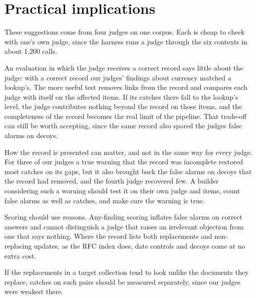 \section{Practical implications}
\label{sec:guide}

These suggestions come from four judges on one corpus. Each is cheap to check with one's own judge, since the harness
runs a judge through the six contexts in about 1,200 calls.

An evaluation in which the judge receives a correct record says little about the judge: with a correct record our
judges' findings about currency matched a lookup's. The more useful test removes links from the record and compares each judge with
itself on the affected items. If its catches there fall to the lookup's level, the judge contributes nothing beyond
the record on those items, and the completeness of the record becomes the real limit of the pipeline. That trade-off
can still be worth accepting, since the same record also spared the judges false alarms on decoys.

How the record is presented can matter, and not in the same way for every judge. For three of our judges a true
warning that the record was incomplete restored most catches on its gaps, but it also brought back the false alarms on
decoys that the record had removed, and the fourth judge recovered few. A builder considering such a warning should
test it on their own judge and items, count false alarms as well as catches, and make sure the warning is true.

Scoring should use reasons. Any-finding scoring inflates false alarms on correct answers and cannot distinguish a
judge that raises an irrelevant objection from one that says nothing. Where the record lists both replacements and
non-replacing updates, as the RFC index does, date controls and decoys come at no extra cost.

If the replacements in a target collection tend to look unlike the documents they replace, catches on such pairs
should be measured separately, since our judges were weakest there.
